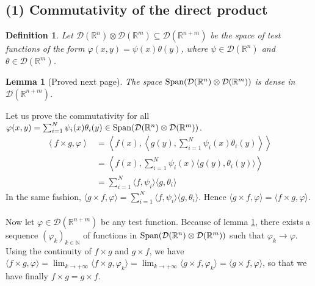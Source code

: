 \documentclass[11pt,a4paper]{article}
\newtheorem{defi}{Definition}
\newtheorem{lem}{Lemma}
\newcommand{\ph}{\varphi}
\newcommand{\N}{\mathbb{N}}
\newcommand{\R}{\mathbb{R}}
\newcommand{\1}{\mathbbm{1}}
\newcommand{\D}{\mathcal{D}}
\begin{document}
\subsection*{(1) Commutativity of the direct product}
\begin{defi}
Let $\D(\R^n) \otimes \D(\R^m) \subseteq \D(\R^{n+m})$ be the space of test functions of the form $\ph(x,y) = \psi(x)\theta(y)$, where $\psi \in \D(\R^n)$ and $\theta \in \D(\R^m)$.
\end{defi}
\begin{lem}[Proved next page] \label{density}
The space $\textnormal{Span}(\D(\R^n) \otimes \D(\R^m))$ is dense in $\D(\R^{n+m})$.
\end{lem}
Let us prove the commutativity for all $\ph(x,y) = \sum_{i=1}^N \psi_i(x)\theta_i(y) \in \textnormal{Span}(\D(\R^n) \otimes \D(\R^m))$.
\begin{align*}
\left\langle f \times g  , \ph \right\rangle
& = \left\langle f(x) , \left\langle g(y) , \sum_{i=1}^N \psi_i(x)\theta_i(y) \right\rangle \right\rangle \\
& = \left\langle f(x) , \sum_{i=1}^N \psi_i(x) \langle g(y) , \theta_i(y) \rangle \right\rangle \\
& = \sum_{i=1}^N \langle f , \psi_i \rangle \langle g , \theta_i \rangle
\end{align*}
In the same fashion, $\langle g \times f , \ph \rangle = \sum_{i=1}^N \langle f,\psi_i \rangle \langle g , \theta_i \rangle$. Hence $\langle g \times f , \ph \rangle = \langle f \times g , \ph \rangle$.\\\\
Now let $\ph \in \D(\R^{n+m})$ be any test function. Because of lemma \ref{density}, there exists a sequence $(\ph_k)_{k\in\N}$ of functions in $\textnormal{Span}(\D(\R^n) \otimes \D(\R^m))$ such that $\ph_k \to \ph$. Using the continuity of $f \times g$ and $g \times f$, we have $\langle f \times g , \ph \rangle = \lim_{k\to +\infty} \langle f \times g , \ph_k \rangle = \lim_{k\to +\infty} \langle g \times f , \ph_k \rangle = \langle g \times f , \ph \rangle$, so that we have finally $f \times g = g \times f$.
\end{document}
